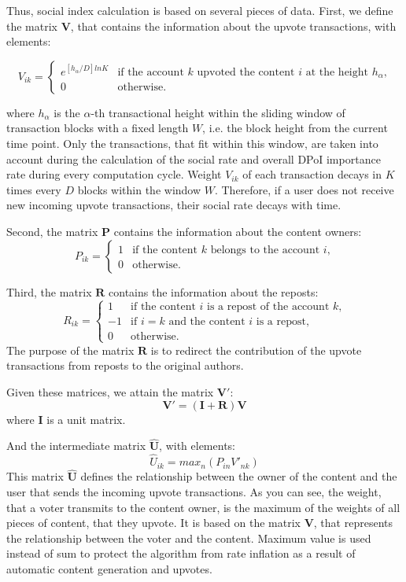 \documentclass[a4paper,12pt]{article}
\begin{document}
Thus, social index calculation is based on several pieces of data. First, we define the matrix $\boldsymbol{V}$, that contains the information about the upvote transactions, with elements:
	
	$$	
	V_{ik} = \begin{cases}
	 e^{[h_\alpha/D]ln K}
	 & \text{if the account $k$ upvoted the content $i$ at the height $h_\alpha$,}\\
	 0 & \text{otherwise.}
	\end{cases}
	$$
	
	where $h_\alpha$ is the $\alpha$-th transactional height within the sliding window of transaction blocks with a fixed length $W$, i.e. the block height from the current time point. Only the transactions, that fit within this window, are taken into account during the calculation of the social rate and overall DPoI importance rate during every computation cycle. Weight $V_{ik}$ of each transaction decays in $K$ times every $D$ blocks within the window $W$. Therefore, if a user does not receive new incoming upvote transactions, their social rate decays with time.
	
	Second, the matrix $\boldsymbol{P}$ contains the information about the content owners:
	$$
	P_{ik} = \begin{cases}
	 1
	 & \text{if the content $k$ belongs to the account $i$,}\\
	 0 & \text{otherwise.}
	\end{cases}
	$$
	
	Third, the matrix $\boldsymbol{R}$ contains the information about the reposts:
	$$
	R_{ik} = \begin{cases}
	 1 & \text{if the content $i$ is a repost of the account $k$,}\\
	 -1 & \text{if $i=k$ and the content $i$ is a repost,}\\
	 0 & \text{otherwise.}
	\end{cases}
	$$
	The purpose of the matrix $\boldsymbol{R}$ is to redirect the contribution of the upvote transactions from reposts to the original authors. 
	
	Given these matrices, we attain the matrix $\boldsymbol{V'}$:
	$$
\boldsymbol{V'} = ( \boldsymbol{I} + \boldsymbol{R} ) \boldsymbol{V}
$$
	where $\boldsymbol{I}$ is a unit matrix.
	
	And the intermediate matrix $\boldsymbol{\hat{U}}$, with elements:
	$$
	\hat{U}_{ik} = max_n(P_{in} V'_{nk})
	$$
	This matrix $\boldsymbol{\hat{U}}$ defines the relationship between the owner of the content and the user that sends the incoming upvote transactions. As you can see, the weight, that a voter transmits to the content owner, is the maximum of the weights of all pieces of content, that they upvote. It is based on the matrix $\boldsymbol{V}$, that represents the relationship between the voter and the content. Maximum value is used instead of sum to protect the algorithm from rate inflation as a result of automatic content generation and upvotes.
	
\end{document}
